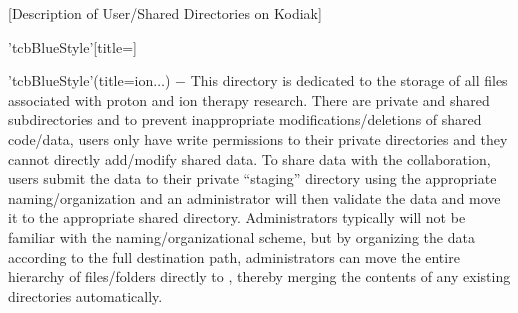 [Description of User/Shared Directories on Kodiak]
\begin{tcbfunctionenv}'tcbBlueStyle'[title=]
\begin{tcbparagraph}'tcbBlueStyle'(title=\dirsep ion\dirsep$\dots$)%
	$\boldsymbol{-}$ This directory is dedicated to the storage of all files associated with proton and ion therapy research.  There are private and shared subdirectories and to prevent inappropriate modifications/deletions of shared code/data, users only have write permissions to their private directories and they cannot directly add/modify shared data.  To share data with the collaboration, users submit the data to their private ``staging'' directory using the appropriate naming/organization and an administrator will then validate the data and move it to the appropriate shared directory.  Administrators typically will not be familiar with the naming/organizational scheme, but by organizing the data according to the full destination path, administrators can move the entire hierarchy of files/folders directly to , thereby merging the contents of any existing directories automatically.\\[\tcbparskip]
	

\end{tcbparagraph}
\end{tcbfunctionenv}
